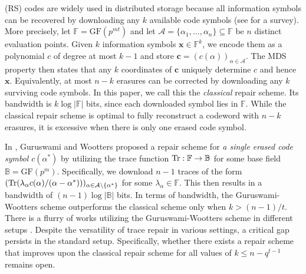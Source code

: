 \documentclass[onecolumn]{IEEEtran}
\theoremstyle{plain}
\theoremstyle{definition}
\newcommand{\FF}{\mathbb{F}}
\newcommand{\BB}{\mathbb{B}}
\newcommand{\GF}{{\mathrm{GF}}}
\newcommand{\cA}{\mathcal{A}}
\newcommand{\tr}{{\rm Tr}}
\newcommand{\kim}[1]{{\color{blue} Kim:#1}}
\begin{document}
 (RS) codes \cite{reedsolomon} are widely used in distributed storage because all information symbols can be recovered by downloading any $k$ available code symbols (see \cite{dinh2022practical} for a survey). More precisely, let $\FF=\GF(p^{mt})$ and let $\cA=\{\alpha_1,\ldots,\alpha_n\}\subseteq\FF$ be $n$ distinct evaluation points. 
Given $k$ information symbols $\boldsymbol{x}\in\FF^k$, we encode them as a polynomial $c$ of degree at most $k-1$ and store $\boldsymbol{c}=(c(\alpha))_{\alpha\in\cA}$. 
The MDS property then states that any $k$ coordinates of $\boldsymbol{c}$ uniquely determine $c$ and hence $\boldsymbol{x}$. Equivalently, at most $n-k$ erasures can be corrected by downloading any $k$ surviving code symbols. In this paper, we call this the \emph{classical} repair scheme. Its bandwidth is $k\log|\FF|$ bits, since each downloaded symbol lies in $\FF$. While the classical repair scheme is optimal to fully reconstruct a codeword with $n-k$ erasures, it is excessive when there is only one erased code symbol.

In \cite{guruswamiwooters2017}, Guruswami and Wootters proposed a repair scheme for {\em a single erased code symbol} $c(\alpha^*)$ by utilizing the trace function $\tr:\FF\to\BB$ for some base field $\BB=\GF(p^m)$. 
Specifically, we download $n-1$ traces of the form $(\tr(\lambda_\alpha c(\alpha)/(\alpha-\alpha^*)))_{\alpha\in\cA\setminus\{\alpha^*\}}$ for some $\lambda_\alpha\in\FF$. 
This then results in a bandwidth of $(n-1)\log|\BB|$ bits. In terms of bandwidth, the Guruswami-Wootters scheme outperforms the classical scheme only when $k> (n-1)/t$. There is a flurry of works utilizing the Guruswami-Wootters scheme in different setups \cite{Duursma2017, Dau2018, Dau2018io, Mardia2019, Tamo2019, Chen2019, Weiqi2019, Dau2021, Berman2022, kiah2024, dinh2024, kim2024decoding, kruglik2025}. Despite the versatility of trace repair in various settings, a critical gap persists in the standard setup. Specifically, whether there exists a repair scheme that improves upon the classical repair scheme for all values of $k\le n-q^{t-1}$ remains open.


\end{document}
